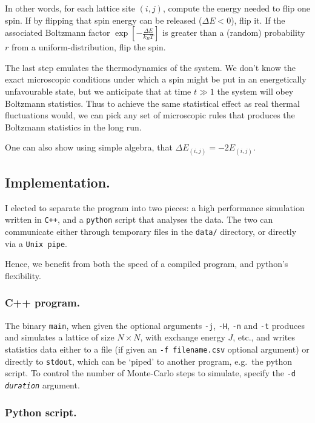 \documentclass[12pt]{article}
\begin{document}
In other words, for each lattice site \( (i, j) \), compute the energy needed to flip one spin. If by flipping that spin energy can be released (\(\Delta E < 0\)), flip it. If the associated Boltzmann factor \(\exp \left[ - \frac{\Delta E }{ k_B T} \right] \) is greater than a (random) probability \(r \) from a uniform-distribution, flip the spin.

The last step emulates the thermodynamics of the system\cite{Algorithm}. We don't know the exact microscopic conditions under which a spin might be put in an energetically unfavourable state, but we anticipate that at time \( t \gg 1\)  the system will obey Boltzmann statistics. Thus to achieve the same statistical effect as real thermal fluctuations would, we can pick any set of microscopic rules that produces the Boltzmann statistics in the long run.

One can also show using simple algebra, that \(\Delta E_{(i, j)} = -2 E_{(i, j)}\).

\subsection{Implementation.}\label{sec:implementation}

I elected to separate the program into two pieces: a high performance simulation written in \texttt{C++}, and a \texttt{python} script that analyses the data. The two can communicate either through temporary files in the \texttt{data/} directory, or directly via a \texttt{Unix pipe}.

Hence, we benefit from both the speed of a compiled program, and python's flexibility. 

\subsubsection{C++ program.}

The binary \texttt{main}, when given the optional arguments \texttt{-j}, \texttt{-H}, \texttt{-n} and \texttt{-t} produces and simulates a lattice of size \(N \times N\), with exchange energy \(J\), etc., and writes statistics data either to a file (if given an \texttt{-f filename.csv} optional argument) or directly to \texttt{stdout}, which can be `piped' to another program, e.g.~the python script. To control the number of Monte-Carlo steps to simulate, specify the \texttt{-d \textit{duration}} argument. 

\subsubsection{Python script.}
\end{document}
